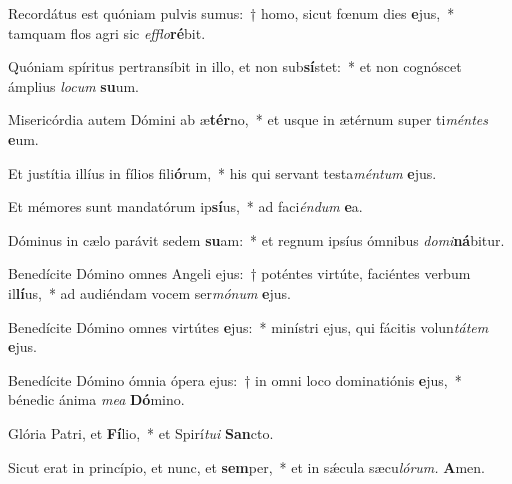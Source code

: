 \item Recordátus est quóniam pulvis sumus:~† homo, sicut fœnum dies \textbf{e}jus,~* tamquam flos agri sic \textit{efflo}\textbf{ré}bit.
\item Quóniam spíritus pertransíbit in illo, et non sub\textbf{sí}stet:~* et non cognóscet ámplius \textit{locum} \textbf{su}um.
\item Misericórdia autem Dómini ab æ\textbf{tér}no,~* et usque in ætérnum super ti\textit{méntes} \textbf{e}um.
\item Et justítia illíus in fílios fili\textbf{ó}rum,~* his qui servant testa\textit{méntum} \textbf{e}jus.
\item Et mémores sunt mandatórum ip\textbf{sí}us,~* ad faci\textit{éndum} \textbf{e}a.
\item Dóminus in cælo parávit sedem \textbf{su}am:~* et regnum ipsíus ómnibus \textit{domi}\textbf{ná}bitur.
\item Benedícite Dómino omnes Angeli ejus:~† poténtes virtúte, faciéntes verbum il\textbf{lí}us,~* ad audiéndam vocem ser\textit{mónum} \textbf{e}jus.
\item Benedícite Dómino omnes virtútes \textbf{e}jus:~* minístri ejus, qui fácitis volun\textit{tátem} \textbf{e}jus.
\item Benedícite Dómino ómnia ópera ejus:~† in omni loco dominatiónis \textbf{e}jus,~* bénedic ánima \textit{mea} \textbf{Dó}mino.
\item Glória Patri, et \textbf{Fí}lio,~* et Spirí\tinyhspace\textit{tui} \textbf{San}cto.
\item Sicut erat in princípio, et nunc, et \textbf{sem}per,~* et in sǽcula sæcu\tinyhspace\textit{lórum.} \textbf{A}men.